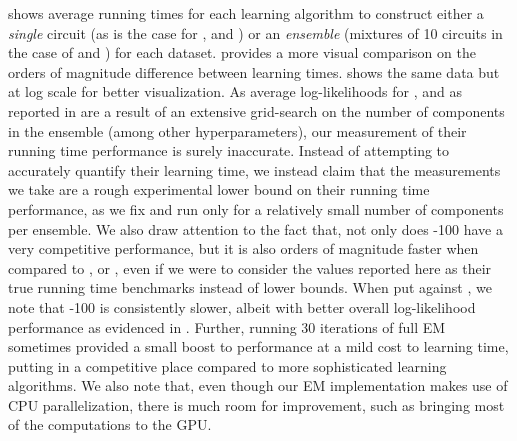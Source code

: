  shows average running times for each learning algorithm to construct either a
\emph{single} circuit (as is the case for ,  and
) or an \emph{ensemble} (mixtures of 10 circuits in the case of
 and ) for each dataset.  provides a more
visual comparison on the orders of magnitude difference between learning times. 
shows the same data but at log scale for better visualization. As average log-likelihoods for
,  and  as reported in  are a
result of an extensive grid-search on the number of components in the ensemble (among other
hyperparameters), our measurement of their running time performance is surely inaccurate. Instead
of attempting to accurately quantify their learning time, we instead claim that the measurements we
take are a rough experimental lower bound on their running time performance, as we fix and run only
for a relatively small number of components per ensemble. We also draw attention to the fact that,
not only does -100 have a very competitive performance, but it is also orders of
magnitude faster when compared to ,  or ,
even if we were to consider the values reported here as their true running time benchmarks instead
of lower bounds. When put against , we note that -100 is
consistently slower, albeit with better overall log-likelihood performance as evidenced in
. Further, running 30 iterations of full EM sometimes provided a small boost to
performance at a mild cost to learning time, putting  in a competitive place
compared to more sophisticated learning algorithms. We also note that, even though our EM
implementation makes use of CPU parallelization, there is much room for improvement, such as
bringing most of the computations to the GPU.


